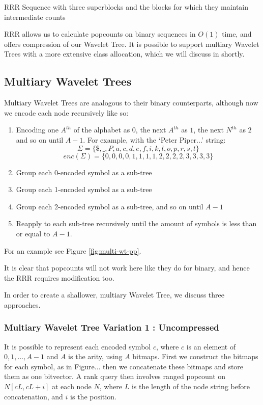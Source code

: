 		{RRR Sequence with three superblocks and the blocks for which they
		maintain intermediate counts}

RRR allows us to calculate popcounts on binary sequences in $O(1)$ time, and 
offers compression of our Wavelet Tree. It is possible to support multiary 
Wavelet Trees with a more extensive class allocation, which we will discuss in 
shortly.

\clearpage
\subsection{Multiary Wavelet Trees}
Multiary Wavelet Trees are analogous to their binary counterparts, although now we encode each node recursively like so:

\begin{enumerate}
    \item Encoding one $A^{th}$ of the alphabet as $0$, the next $A^{th}$ as 
		$1$, the next $N^{th}$ as $2$ and so on until $A-1$. For example, with 
		the `Peter Piper...' string:
		$$\Sigma = \{ \$, \_, P, a, c, d, e, f, i, k, l, o, p, r, s, t \}$$
	   	$$enc(\Sigma) = \{  0,  0, 0, 0, 1, 1, 1, 1, 2, 2, 2, 2, 3, 3, 3, 3 \}$$
    \item Group each 0-encoded symbol as a sub-tree
    \item Group each 1-encoded symbol as a sub-tree
    \item Group each 2-encoded symbol as a sub-tree, and so on until $A-1$
    \item Reapply to each sub-tree recursively until the amount of symbols is
	less than or equal to $A - 1$.
\end{enumerate}

For an example see Figure \ref{fig:multi-wt-pp}.

It is clear that popcounts will not work
here like they do for binary, and hence the RRR requires modification too.

In order to create a shallower, multiary Wavelet Tree, we discuss three approaches.

\subsubsection{Multiary Wavelet Tree Variation 1 : Uncompressed}
It is possible to represent each encoded symbol $c$, where $c$ is an element of
${ 0, 1,..., A - 1}$ and $A$ is the arity, using $A$ bitmaps. First we construct
the bitmaps for each symbol, as in Figure... then we concatenate these bitmaps
and store them as one bitvector. A rank query then involves ranged popcount
on $N[c L, c L + i]$ at each node $N$, where $L$ is the length of the node 
string before concatenation, and $i$ is the position.


